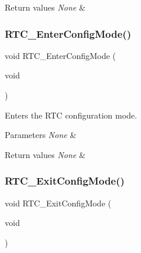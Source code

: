 \begin{DoxyRetVals}{Return values}
{\em None} & \\
\hline
\end{DoxyRetVals}
\mbox{\label{group___r_t_c___exported___functions_ga23612d9da2fe057a0cd72c684e5b438a}} 
\subsubsection{\texorpdfstring{RTC\_EnterConfigMode()}{RTC\_EnterConfigMode()}}
{\footnotesize\ttfamily void R\+T\+C\+\_\+\+Enter\+Config\+Mode (\begin{DoxyParamCaption}\item[{void}]{ }\end{DoxyParamCaption})}



Enters the R\+TC configuration mode. 


\begin{DoxyParams}{Parameters}
{\em None} & \\
\hline
\end{DoxyParams}

\begin{DoxyRetVals}{Return values}
{\em None} & \\
\hline
\end{DoxyRetVals}
\mbox{\label{group___r_t_c___exported___functions_ga7585aa6e2dbb497173b2fd03bac0d304}} 
\subsubsection{\texorpdfstring{RTC\_ExitConfigMode()}{RTC\_ExitConfigMode()}}
{\footnotesize\ttfamily void R\+T\+C\+\_\+\+Exit\+Config\+Mode (\begin{DoxyParamCaption}\item[{void}]{ }\end{DoxyParamCaption})}



